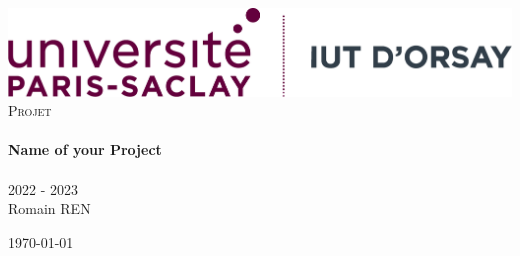     \pagestyle{fancy}
    \fancyhf{}
    \lhead{} %
    \rhead{} %
    
    \begin{titlepage}
    \vbox{ }

    \begin{center}
        \includegraphics[width=1\textwidth]{logo-iutorsay.png}\\[4cm]
        \textsc{\Large Projet}\\[0.7cm]

        \noindent\makebox[\linewidth]{\rule{.7\paperwidth}{.6pt}}\\[0.7cm]
        { \huge \bfseries Name of your Project}\\[0.25cm]
        \noindent\makebox[\linewidth]{\rule{.7\paperwidth}{.6pt}}\\[0.7cm]
        \large{2022 - 2023}\\[1.2cm]
        \vfill
        \large
        Romain REN

        {\large \today}
    \end{center}
    \end{titlepage}
